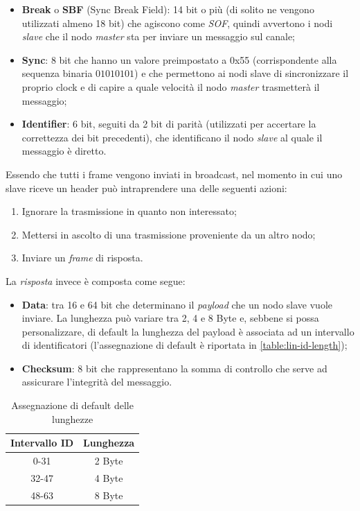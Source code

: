 \begin{itemize}
    \item \textbf{Break} o \textbf{SBF} (Sync Break Field): 14 bit o più (di solito ne vengono utilizzati almeno 18 bit) che agiscono come \emph{SOF}, quindi avvertono i nodi \emph{slave} che il nodo \emph{master} sta per inviare un messaggio sul canale;
    \item \textbf{Sync}: 8 bit che hanno un valore preimpostato a 0x55 (corrispondente alla sequenza binaria $01010101$) e che permettono ai nodi slave di sincronizzare il proprio clock e di capire a quale velocità il nodo \emph{master} trasmetterà il messaggio;
    \item \textbf{Identifier}: 6 bit, seguiti da 2 bit di parità (utilizzati per accertare la correttezza dei bit precedenti), che identificano il nodo \emph{slave} al quale il messaggio è diretto. \cite{css_electronics_lin}
\end{itemize}

Essendo che tutti i frame vengono inviati in broadcast, nel momento in cui uno slave riceve un header può intraprendere una delle seguenti azioni:
\begin{enumerate}
    \item Ignorare la trasmissione in quanto non interessato;
    \item Mettersi in ascolto di una trasmissione proveniente da un altro nodo;
    \item Inviare un \emph{frame} di risposta.
\end{enumerate}

La \emph{risposta} invece è composta come segue:
\begin{itemize}
    \item \textbf{Data}: tra 16 e 64 bit che determinano il \emph{payload} che un nodo slave vuole inviare. La lunghezza può variare tra 2, 4 e 8 Byte e, sebbene si possa personalizzare, di default la lunghezza del payload è associata ad un intervallo di identificatori (l'assegnazione di default è riportata in \autoref{table:lin-id-length});
    \item \textbf{Checksum}: 8 bit che rappresentano la somma di controllo che serve ad assicurare l'integrità del messaggio. \cite{css_electronics_lin}
\end{itemize}

\begin{table}[h]
    \centering
    \begin{tabular}{| c | c |}
        \hline
        \large{\textbf{Intervallo ID}} & \large{\textbf{Lunghezza}} \\
        \hline\hline
        0-31 & 2 Byte \\
        \hline
        32-47 & 4 Byte \\
        \hline
        48-63 & 8 Byte \\
        \hline
    \end{tabular}
    \caption{Assegnazione di default delle lunghezze}
    \label{table:lin-id-length}
\end{table}

